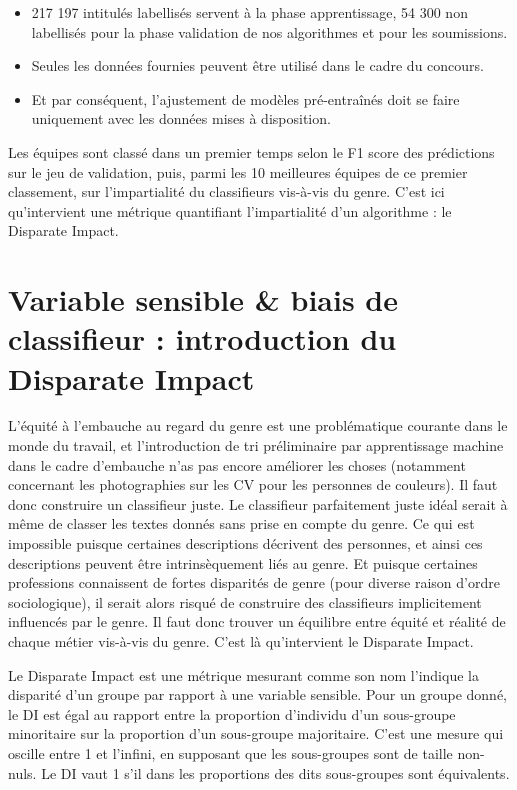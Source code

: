 \begin{itemize}
\item 217 197 intitulés labellisés servent à la phase apprentissage, 54 300 non labellisés pour la phase validation de nos algorithmes et pour les soumissions.
\item Seules les données fournies peuvent être utilisé dans le cadre du concours.
\item Et par conséquent, l’ajustement de modèles pré-entraînés doit se faire uniquement avec les données mises à disposition.
\end{itemize}

Les équipes sont classé dans un premier temps selon le F1 score des prédictions sur le jeu de validation, puis, parmi les 10 meilleures équipes de ce premier classement, sur l’impartialité du classifieurs vis-à-vis du genre. C’est ici qu’intervient une métrique quantifiant l’impartialité d’un algorithme : le Disparate Impact. 

\section{Variable sensible \& biais de classifieur : introduction du Disparate Impact}

L’équité à l’embauche au regard du genre est une problématique courante dans le monde du travail, et l’introduction de tri préliminaire par apprentissage machine dans le cadre d’embauche n’as pas encore améliorer les choses (notamment concernant les photographies sur les CV pour les personnes de couleurs). Il faut donc construire un classifieur juste. Le classifieur parfaitement juste idéal serait à même de classer les textes donnés sans prise en compte du genre. Ce qui est impossible puisque certaines descriptions décrivent des personnes, et ainsi ces descriptions peuvent être intrinsèquement liés au genre. Et puisque certaines professions connaissent de fortes disparités de genre (pour diverse raison d’ordre sociologique), il serait alors risqué de construire des classifieurs implicitement influencés par le genre. Il faut donc trouver un équilibre entre équité et réalité de chaque métier vis-à-vis du genre. C’est là qu’intervient le Disparate Impact.
\newline

Le Disparate Impact est une métrique mesurant comme son nom l’indique la disparité d’un groupe par rapport à une variable sensible. Pour un groupe donné, le DI est égal au rapport entre la proportion d’individu d’un sous-groupe minoritaire sur la proportion d’un sous-groupe majoritaire. C’est une mesure qui oscille entre 1 et l'infini, en supposant que les sous-groupes sont de taille non-nuls. Le DI vaut 1 s’il dans les proportions des dits sous-groupes sont équivalents.
\newline

